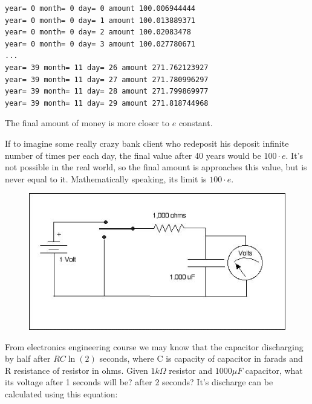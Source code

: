 

\begin{lstlisting}
year= 0 month= 0 day= 0 amount 100.006944444
year= 0 month= 0 day= 1 amount 100.013889371
year= 0 month= 0 day= 2 amount 100.02083478
year= 0 month= 0 day= 3 amount 100.027780671
...
year= 39 month= 11 day= 26 amount 271.762123927
year= 39 month= 11 day= 27 amount 271.780996297
year= 39 month= 11 day= 28 amount 271.799869977
year= 39 month= 11 day= 29 amount 271.818744968
\end{lstlisting}

The final amount of money is more closer to $e$ constant.

If to imagine some really crazy bank client who redeposit his deposit infinite number of times per each day, the final value after 40 years
would be $100 \cdot e$.
It's not possible in the real world, so the final amount is approaches this value, but is never equal to it.
Mathematically speaking, its limit is $100 \cdot e$.


\leveldown{}


\begin{figure}[H]
\centering
\includegraphics[scale=0.66]{log/Schematic_of_Battery_and_Capacitor.jpg}
\end{figure}

From electronics engineering course we may know that the capacitor discharging by half after $RC\ln(2)$ seconds,
where C is capacity of capacitor in farads and R resistance of resistor in ohms.
Given $1k\Omega$ resistor and $1000 \mu F$ capacitor, what its voltage after 1 seconds will be? after 2 seconds?
It's discharge can be calculated using this equation:

